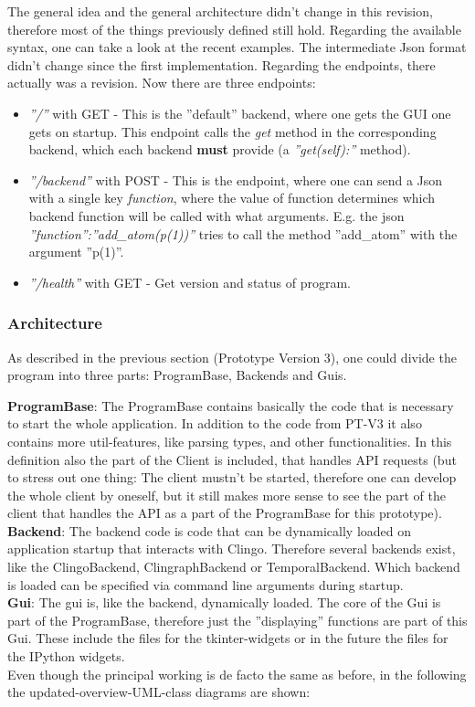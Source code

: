 \documentclass[12pt,a4paper]{article}
\newcommand{\<}[1]{\guilsinglleft}
\renewcommand{\>}[1]{\guilsinglright}
\begin{document}
\noindent
The general idea and the general architecture didn't change in this revision, therefore most of the things previously defined still hold. Regarding the available syntax, one can take a look at the recent examples. The intermediate Json format didn't change since the first implementation. Regarding the endpoints, there actually was a revision. Now there are three endpoints:
\begin{itemize}
    \item \textit{''/''} with GET - This is the ''default'' backend, where one gets the GUI one gets on startup. This endpoint calls the \textit{get} method in the corresponding backend, which each backend \textbf{must} provide (a \textit{''get(self):''} method).
    \item \textit{''/backend''} with POST - This is the endpoint, where one can send a Json with a single key \textit{function}, where the value of function determines which backend function will be called with what arguments. E.g. the json \textit{''function'':''add_atom(p(1))''} tries to call the method ''add_atom'' with the argument ''p(1)''.
    \item \textit{''/health''} with GET - Get version and status of program.
\end{itemize}

\subsubsection{Architecture}

\noindent As described in the previous section (Prototype Version 3), one could divide the program into three parts: ProgramBase, Backends and Guis.

\textbf{ProgramBase}: The ProgramBase contains basically the code that is necessary to start the whole application. In addition to the code from PT-V3 it also contains more util-features, like parsing types, and other functionalities. In this definition also the part of the Client is included, that handles API requests (but to stress out one thing: The client mustn't be started, therefore one can develop the whole client by oneself, but it still makes more sense to see the part of the client that handles the API as a part of the ProgramBase for this prototype).\\[1em]
\textbf{Backend}: The backend code is code that can be dynamically loaded on application startup that interacts with Clingo. Therefore several backends exist, like the ClingoBackend, ClingraphBackend or TemporalBackend. Which backend is loaded can be specified via command line arguments during startup.\\[1em]
\textbf{Gui}: The gui is, like the backend, dynamically loaded. The core of the Gui is part of the ProgramBase, therefore just the ''displaying'' functions are part of this Gui. These include the files for the tkinter-widgets or in the future the files for the IPython widgets.\\[1em]
Even though the principal working is de facto the same as before, in the following the updated-overview-UML-class diagrams are shown:
\end{document}
